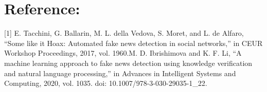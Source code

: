 \documentclass{article}
\begin{document}
    \section{Reference:}
        

[1]	E. Tacchini, G. Ballarin, M. L. della Vedova, S. Moret, and L. de Alfaro, “Some like it Hoax: Automated fake news detection in social networks,” in CEUR Workshop Proceedings, 2017, vol. 1960.\break\break
[2]	M. D. Ibrishimova and K. F. Li, “A machine learning approach to fake news detection using knowledge verification and natural language processing,” in Advances in Intelligent Systems and Computing, 2020, vol. 1035. doi: 10.1007/978-3-030-29035-1\_22.

        
   
\end{document}

